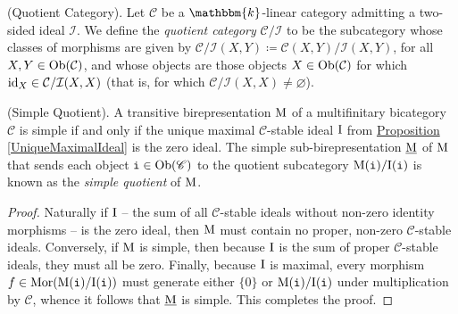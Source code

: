 \noindent\begin{definition}\!\textnormal{(Quotient Category).}\label{QuotientCategory } Let $\mathcal{C}$ be a $\mathbbm{k}$-linear category admitting a two-sided ideal $\mathcal{I}$. We define the {\em quotient category} $\mathcal{C}/\mathcal{I}$ to be the subcategory whose classes of morphisms are given by $\mathcal{C}/\mathcal{I}(X, Y) \coloneqq \mathcal{C}(X, Y)/\mathcal{I}(X, Y)$, for all $X, Y \in \textnormal{Ob}(\mathcal{C})$, and whose objects are those objects $X \in \textnormal{Ob}(\mathcal{C})$ for which $\textnormal{id}_X \in \mathcal{C}/\mathcal{I}(X, X)$ (that is, for which $\mathcal{C}/\mathcal{I}(X, X) \neq \varnothing$).\\
\end{definition}

\noindent\begin{propositiondefinition}\!\textnormal{(Simple Quotient).}\label{SimpleQuotient} \!A transitive birepresentation $\textnormal{M}$ of a %
multifinitary bicategory $\mathscr{C}$ is simple if and only if the unique maximal $\mathscr{C}$-stable ideal $\textnormal{I}$ from \hyperref[UniqueMaximalIdeal]{Proposition \ref*{UniqueMaximalIdeal}} is the zero ideal. The simple sub-birepresentation $\underline{\textnormal{M}}$ of $\textnormal{M}$ that sends each object $\textnormal{\texttt{i}} \in \textnormal{Ob}(\mathscr{C})$ to the quotient subcategory $\textnormal{M}(\textnormal{\texttt{i}})/\textnormal{I}(\textnormal{\texttt{i}})$ is known as the {\em simple quotient} of $\textnormal{M}$.\\
\end{propositiondefinition}

\noindent\begin{proof} Naturally if $\textnormal{I}$ -- the sum of all $\mathscr{C}$-stable ideals without non-zero identity morphisms -- is the zero ideal, then $\textnormal{M}$ must contain no proper, non-zero $\mathscr{C}$-stable ideals. Conversely, if $\textnormal{M}$ is simple, then because $\textnormal{I}$ is the sum of proper $\mathscr{C}$-stable ideals, they must all be zero. Finally, because $\textnormal{I}$ is maximal, every morphism $f \in \textnormal{Mor}(\textnormal{M}(\textnormal{\texttt{i}})/\textnormal{I}(\textnormal{\texttt{i}}))$ must generate either $\{0\}$ or $\textnormal{M}(\textnormal{\texttt{i}})/\textnormal{I}(\textnormal{\texttt{i}})$ under multiplication by $\mathscr{C}$, whence it follows that $\underline{\textnormal{M}}$ is simple. This completes the proof.
\end{proof}\\

